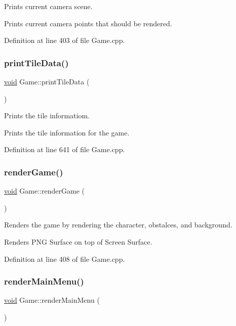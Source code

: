 Prints current camera scene. 

Prints current camera points that should be rendered. 

Definition at line 403 of file Game.\+cpp.

\mbox{\label{class_game_a07319c02e980c2ec153312d18061b566}} 
\subsubsection{\texorpdfstring{printTileData()}{printTileData()}}
{\footnotesize\ttfamily \mbox{\hyperlink{_s_d_l__opengles2__gl2ext_8h_ae5d8fa23ad07c48bb609509eae494c95}{void}} Game\+::print\+Tile\+Data (\begin{DoxyParamCaption}{ }\end{DoxyParamCaption})}



Prints the tile informatiom. 

Prints the tile information for the game. 

Definition at line 641 of file Game.\+cpp.

\mbox{\label{class_game_a4573580347746dbb7dbe568383682ed3}} 
\subsubsection{\texorpdfstring{renderGame()}{renderGame()}}
{\footnotesize\ttfamily \mbox{\hyperlink{_s_d_l__opengles2__gl2ext_8h_ae5d8fa23ad07c48bb609509eae494c95}{void}} Game\+::render\+Game (\begin{DoxyParamCaption}{ }\end{DoxyParamCaption})}



Renders the game by rendering the character, obstalces, and background. 

Renders P\+NG Surface on top of Screen Surface. 

Definition at line 408 of file Game.\+cpp.

\mbox{\label{class_game_a9c9dea0cba2587b634793698e0e2d65c}} 
\subsubsection{\texorpdfstring{renderMainMenu()}{renderMainMenu()}}
{\footnotesize\ttfamily \mbox{\hyperlink{_s_d_l__opengles2__gl2ext_8h_ae5d8fa23ad07c48bb609509eae494c95}{void}} Game\+::render\+Main\+Menu (\begin{DoxyParamCaption}{ }\end{DoxyParamCaption})}



